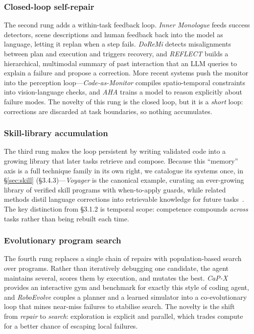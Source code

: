 \subsubsection{Closed-loop self-repair}
\label{ssec:selfrepair}
The second rung adds a within-task feedback loop. \emph{Inner Monologue}
\citep{innermonologue} feeds success detectors, scene descriptions and human feedback back
into the model as language, letting it replan when a step fails. \emph{DoReMi}
\citep{doremi} detects misalignments between plan and execution and triggers recovery, and
\emph{REFLECT} \citep{reflect} builds a hierarchical, multimodal summary of past
interaction that an LLM queries to explain a failure and propose a correction. More recent
systems push the monitor into the perception loop---\emph{Code-as-Monitor}
\citep{codeasmonitor} compiles spatio-temporal constraints into vision-language checks, and
\emph{AHA} \citep{aha} trains a model to reason explicitly about failure modes. The novelty
of this rung is the closed loop, but it is a \emph{short} loop: corrections are discarded
at task boundaries, so nothing accumulates.

\subsubsection{Skill-library accumulation}
\label{ssec:skilllib}
The third rung makes the loop persistent by writing validated code into a growing library
that later tasks retrieve and compose. Because this ``memory'' axis is a full technique
family in its own right, we catalogue its systems once, in \S\ref{sec:skill}
(\S3.4.3)---\emph{Voyager} \citep{voyager} is the canonical example, curating an
ever-growing library of verified skill programs with when-to-apply guards, while related
methods distil language corrections into retrievable knowledge for future tasks~\citep{droc}. The key
distinction from \S3.1.2 is temporal scope: competence compounds \emph{across} tasks rather
than being rebuilt each time.

\subsubsection{Evolutionary program search}
\label{ssec:search}
The fourth rung replaces a single chain of repairs with population-based search over
programs. Rather than iteratively debugging one candidate, the agent maintains several,
scores them by execution, and mutates the best. \emph{CaP-X} \citep{capx} provides an
interactive gym and benchmark for exactly this style of coding agent, and \emph{RoboEvolve}
\citep{roboevolve} couples a planner and a learned simulator into a co-evolutionary loop
that mines near-miss failures to stabilise search. The novelty is the shift from
\emph{repair} to \emph{search}: exploration is explicit and parallel, which trades compute
for a better chance of escaping local failures.

